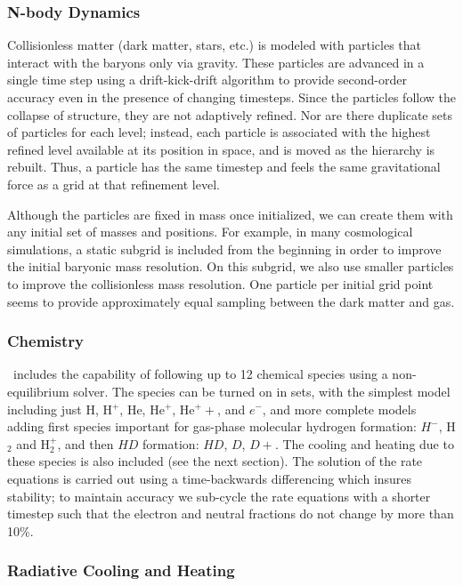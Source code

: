 \subsubsection{N-body Dynamics}

Collisionless matter (dark matter, stars, etc.) is modeled with
particles that interact with the baryons only via gravity.  These
particles are advanced in a single time step using a drift-kick-drift
algorithm to provide second-order accuracy even in the presence of
changing timesteps.  Since the particles follow the collapse of
structure, they are not adaptively refined.  Nor are there duplicate
sets of particles for each level; instead, each particle is associated
with the highest refined level available at its position in space, and is
moved as the hierarchy is rebuilt.  Thus, a particle has the same
timestep and feels the same gravitational force as a grid at that refinement
level.

Although the particles are fixed in mass once initialized, we can
create them with any initial set of masses and positions.  For example, in
many cosmological simulations, a static subgrid is included from the
beginning in order to improve the initial baryonic mass resolution.
On this subgrid, we also use smaller particles to improve the
collisionless mass resolution.  One particle per initial grid point
seems to provide approximately equal sampling between the dark matter
and gas.

\subsubsection{Chemistry}
\label{sec.ov.chem}

\enzo\ includes the capability of following up to
12 chemical species using a non-equilibrium solver.  The species can
be turned on in sets, with the simplest model including just H, H$^+$,
He, He$^+$, He$^++$, and $e^-$, and more complete models adding first
species important for gas-phase molecular hydrogen formation: $H^-$,
H$_2$ and H$_2^+$, and then $HD$ formation: $HD$, $D$, $D+$.  The
cooling and heating due to these species is also included (see the
next section).  The solution of the rate equations is carried out
using a time-backwards differencing which insures stability; to
maintain accuracy we sub-cycle the rate equations with a shorter
timestep such that the electron and neutral fractions do not change by
more than 10\%.

\subsubsection{Radiative Cooling and Heating}


